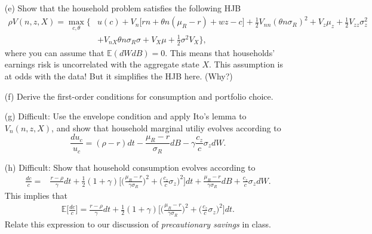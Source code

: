 \documentclass[11pt]{extarticle}
\theoremstyle{plain}
\theoremstyle{definition}
\begin{document}
\begin{enumerate}
\item [(e)] Show that the household problem satisfies the following HJB
\begin{align*}
	\rho V(n, z, X) = \max_{c, \theta} \bigg\{& u(c) + V_n \Big[ rn + \theta n (\mu_R - r) + wz - c \Big] + \frac{1}{2} V_{nn} (\theta n \sigma_R)^2 + V_z \mu_z + \frac{1}{2} V_{zz} \sigma_z^2 \\
	&+ V_{n X} \theta n \sigma_R \sigma + V_X \mu + \frac{1}{2} \sigma^2 V_{X} \bigg\},
\end{align*}
where you can assume that $\mathbb{E}(dW dB) = 0$. This means that households' earnings risk is uncorrelated with the aggregate state $X$. This assumption is at odds with the data! But it simplifies the HJB here. (Why?)

\item [(f)] Derive the first-order conditions for consumption and portfolio choice. 

\item [(g)] Difficult: Use the envelope condition and apply Ito's lemma to $V_n(n, z, X)$, and show that household marginal utiliy evolves according to 
\begin{equation*}
	\frac{d u_c}{u_c} = (\rho - r) dt -  \frac{\mu_R - r}{\sigma_R} dB  - \gamma \frac{c_z}{c} \sigma_z dW .
\end{equation*}

\item [(h)] Difficult: Show that household consumption evolves according to 
\begin{align*}
	\frac{dc}{c} = & \frac{r - \rho}{\gamma} dt + \frac{1}{2} (1+\gamma) \bigg[ \bigg( \frac{\mu_R - r}{\gamma \sigma_R} \bigg)^2 + \bigg( \frac{c_z}{c} \sigma_z \bigg)^2 \bigg] dt +  \frac{\mu_R - r}{\gamma \sigma_R} dB  + \frac{c_z}{c} \sigma_z dW .
\end{align*}
This implies that 
\begin{align*}
	\mathbb E\bigg[ \frac{dc}{c} \bigg] = \frac{r - \rho}{\gamma} dt + \frac{1}{2} (1+\gamma) \bigg[ \bigg( \frac{\mu_R - r}{\gamma \sigma_R} \bigg)^2 + \bigg( \frac{c_z}{c} \sigma_z \bigg)^2 \bigg] dt. 
\end{align*}
Relate this expression to our discussion of \textit{precautionary savings} in class.


\end{enumerate}
\end{document}
